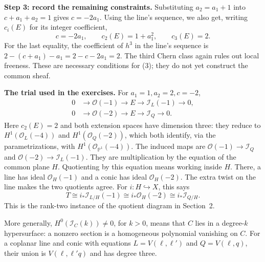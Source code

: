\documentclass[11pt,a4paper]{article}
\theoremstyle{remark}
\begin{document}
\textbf{Step 3: record the remaining
constraints.}
Substituting $a_2=a_1+1$ into
$c+a_1+a_2=1$ gives $c=-2a_1$.
Using the line's sequence, we also get,
writing
$c_i(E)$ for its integer coefficient,
$$
c=-2a_1,\qquad c_2(E)=1+a_1^2,
\qquad c_3(E)=2.
$$
For the last equality, the coefficient
of $h^3$ in the line's sequence is
$2-(c+a_1)-a_1=2-c-2a_1=2$.
The third Chern class again rules out
local freeness. These are necessary
conditions for (3); they do not yet
construct the common sheaf.

\textbf{The trial used in the exercises.}
For $a_1=1,a_2=2,c=-2$,
$$
\begin{aligned}
0&\longrightarrow\mathcal{O}(-1)
\longrightarrow E
\longrightarrow\mathcal{I}_L(-1)
\longrightarrow0,\\
0&\longrightarrow\mathcal{O}(-2)
\longrightarrow E
\longrightarrow\mathcal{I}_Q
\longrightarrow0.
\end{aligned}
$$
Here $c_2(E)=2$ and both extension
spaces have dimension three: they
reduce to $H^1(\mathcal{O}_L(-4))$
and $H^1(\mathcal{O}_Q(-2))$, which
both identify, via the parametrizations,
with
$H^1(\mathcal{O}_{\mathbb{P}^1}(-4))$.
The induced maps are
$\mathcal{O}(-1)\to\mathcal{I}_Q$
and $\mathcal{O}(-2)\to\mathcal{I}_L(-1)$.
They are multiplication by the equation
of the common plane $H$.
Quotienting by this equation means
working inside $H$. There, a line has
ideal $\mathcal{O}_H(-1)$ and a conic
has ideal $\mathcal{O}_H(-2)$.
The extra twist on the line makes
the two quotients agree.
For $i:H\hookrightarrow X$, this says
$$
T\cong i_*\mathcal{I}_{L/H}(-1)
\cong i_*\mathcal{O}_H(-2)
\cong i_*\mathcal{I}_{Q/H}.
$$
This is the rank-two instance of the
quotient diagram in Section~2.

More generally,
$H^0(\mathcal{I}_C(k))\ne0$, for $k>0$,
means that $C$ lies in a degree-$k$
hypersurface: a nonzero section is
a homogeneous polynomial vanishing
on $C$.
For a coplanar line and conic with
equations $L=V(\ell,\ell')$ and
$Q=V(\ell,q)$, their union is
$V(\ell,\ell'q)$ and has degree three.
\end{document}
